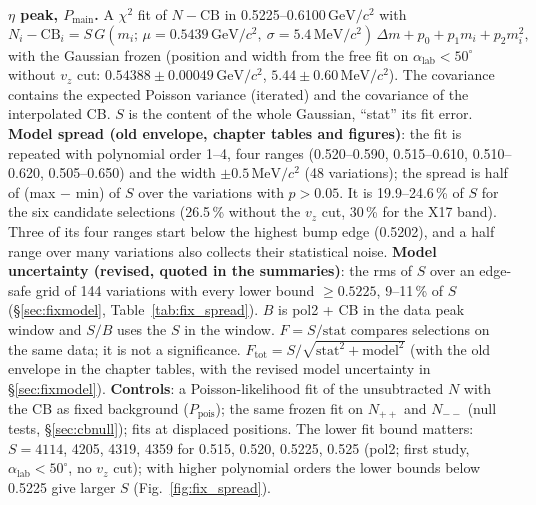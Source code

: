 \documentclass[11pt,a4paper]{article}
\newcommand{\GeVcc}{\ensuremath{\mathrm{GeV}/c^{2}}\xspace}
\newcommand{\MeVcc}{\ensuremath{\mathrm{MeV}/c^{2}}\xspace}
\newcommand{\alab}{\ensuremath{\alpha_{\mathrm{lab}}}\xspace}
\newcommand{\Pmain}{\ensuremath{P_{\mathrm{main}}}\xspace}
\newcommand{\vz}{\ensuremath{v_z}\xspace}
\begin{document}
\textbf{$\eta$ peak, \Pmain.} A $\chi^2$ fit of $N-\mathrm{CB}$ in 0.5225--0.6100\,\GeVcc with
\begin{equation}
N_i-\mathrm{CB}_i = S\,G(m_i;\,\mu=0.5439\,\mathrm{GeV}/c^2,\ \sigma=5.4\,\mathrm{MeV}/c^2)\,\Delta m + p_0+p_1m_i+p_2m_i^2 ,
\label{eq:pmain}
\end{equation}
with the Gaussian frozen (position and width from the free fit on $\alab<50^\circ$ without $\vz$ cut:
$0.54388\pm0.00049$\,\GeVcc, $5.44\pm0.60$\,\MeVcc). The covariance contains the expected Poisson variance
(iterated) and the covariance of the interpolated CB. $S$ is the content of the whole Gaussian, ``stat'' its fit
error. \textbf{Model spread (old envelope, chapter tables and figures)}: the fit is repeated with polynomial
order 1--4, four ranges (0.520--0.590, 0.515--0.610, 0.510--0.620, 0.505--0.650) and the width $\pm0.5$\,\MeVcc
(48 variations); the spread is half of (max $-$ min) of $S$ over the variations with $p>0.05$. It is
19.9--24.6\,\% of $S$ for the six candidate selections (26.5\,\% without the $\vz$ cut, 30\,\% for the X17 band).
Three of its four ranges start below the highest bump edge (0.5202), and a half range over many variations also
collects their statistical noise. \textbf{Model uncertainty (revised, quoted in the summaries)}: the rms of $S$ over
an edge-safe grid of 144 variations with every lower bound $\ge0.5225$, 9--11\,\% of $S$ (\S\ref{sec:fixmodel},
Table~\ref{tab:fix_spread}). $B$ is pol2 + CB in the data peak window and $S/B$ uses the $S$ in the window.
$F=S/\mathrm{stat}$ compares selections on the same data; it is not a significance.
$F_{\mathrm{tot}}=S/\sqrt{\mathrm{stat}^2+\mathrm{model}^2}$ (with the old envelope in the chapter tables, with the
revised model uncertainty in \S\ref{sec:fixmodel}).
\textbf{Controls}: a Poisson-likelihood fit of the unsubtracted $N$ with the CB as fixed background
($P_{\mathrm{pois}}$); the same frozen fit on $N_{++}$ and $N_{--}$ (null tests, \S\ref{sec:cbnull}); fits at
displaced positions. The lower fit bound matters: $S=4114$, 4205, 4319, 4359 for 0.515, 0.520, 0.5225, 0.525
(pol2; first study, $\alab<50^\circ$, no $\vz$ cut); with higher polynomial orders the lower bounds below 0.5225
give larger $S$ (Fig.~\ref{fig:fix_spread}).
\end{document}
